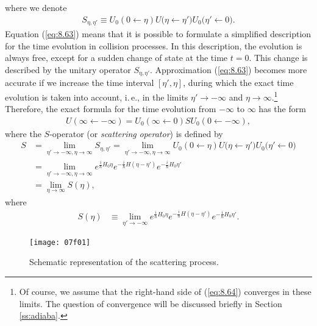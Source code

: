 \documentclass[]{stefan1}
\begin{document}
where we denote
%
\begin{align}
S_{\eta , \eta '} \equiv U_{0}(0 \gets \eta ) U \bigl( \eta \gets \eta
' \bigr) U_{0} \bigl( \eta ' \gets 0 \bigr)
. \label{eq:8.64}
\end{align}
Equation (\ref{eq:8.63}) means that it is possible to formulate a
simplified description for the time evolution in collision processes.
In this description, the evolution is always free, except for a sudden
change of state at the time $ t = 0 $. This change is described by the
unitary operator $ S_{\eta , \eta '} $. Approximation (\ref{eq:8.63})
becomes more accurate if we increase the time interval $  [ \eta ',
\eta  ]  $, during which the exact time evolution is taken into
account, i.\,e., in the limits $ \eta '\to - \infty $ and $\eta \to
\infty $.\footnote{Of course, we assume that the right-hand side of
(\ref{eq:8.64}) converges in these limits. The question of convergence
will be discussed briefly in Section \ref{ss:adiaba}.} Therefore, the
exact formula for the time evolution from $ -\infty $ to $ \infty $ has
the form
%
\begin{align}
U(\infty \gets -\infty ) = U_{0}(\infty \gets 0) S U_{0}(0
\gets - \infty ), \label{eq:8.65}
\end{align}
where the $S$-operator  (or \emph{scattering} \emph{operator})
is defined by
\label{lb:s-oper}
%
\begin{align}
S &= \lim_{\eta ' \to -\infty , \eta \to \infty } S_{\eta , \eta '} = \lim_{\eta ' \to -\infty , \eta \to \infty }
U_{0}(0 \gets \eta ) U \bigl( \eta \gets \eta ' \bigr)
U_{0} \bigl( \eta ' \gets 0 \bigr)
\nonumber
\\
&= \lim_{\eta ' \to -\infty , \eta \to \infty } e^{\frac{i}{\hbar }H
_{0}
\eta } e^{-\frac{i}{\hbar }H  ( \eta - \eta ' ) } e^{-\frac{i}{
\hbar }H_{0} \eta '}
\label{eq:8.73a}
\\
&= \lim_{\eta \to \infty } S(\eta ),
\nonumber
\end{align}
where
%
\begin{align}
S(\eta ) &\equiv \lim_{\eta ' \to - \infty } e^{\frac{i}{\hbar }H_{0}
\eta } e^{-\frac{i}{\hbar }H ( \eta -\eta ' ) }
e^{-\frac{i}{
\hbar }H_{0}\eta '}. \label{eq:seta}
\end{align}


\begin{SCfigure}
\texttt{[image: 07f01]}
\caption{Schematic representation of the scattering process.}
\label{fig:6.1}
\end{SCfigure}
\end{document}
